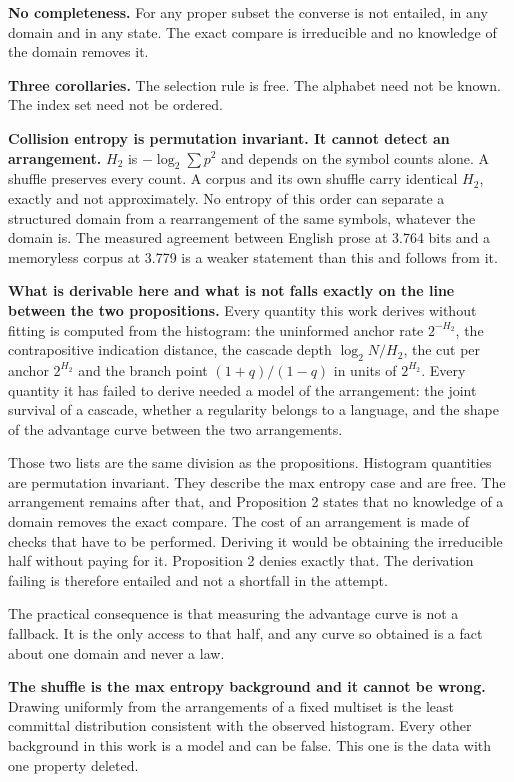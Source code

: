\textbf{No completeness.} For any proper subset the converse is not entailed, in any domain and in any state. The exact compare is irreducible and no knowledge of the domain removes it.

\textbf{Three corollaries.} The selection rule is free. The alphabet need not be known. The index set need not be ordered.

\textbf{Collision entropy is permutation invariant. It cannot detect an arrangement.} \(H_2\) is \(-\log_2 \sum p^2\) and depends on the symbol counts alone. A shuffle preserves every count. A corpus and its own shuffle carry identical \(H_2\), exactly and not approximately. No entropy of this order can separate a structured domain from a rearrangement of the same symbols, whatever the domain is. The measured agreement between English prose at 3.764 bits and a memoryless corpus at 3.779 is a weaker statement than this and follows from it.

\textbf{What is derivable here and what is not falls exactly on the line between the two propositions.} Every quantity this work derives without fitting is computed from the histogram: the uninformed anchor rate \(2^{-H_2}\), the contrapositive indication distance, the cascade depth \(\log_2 N / H_2\), the cut per anchor \(2^{H_2}\) and the branch point \((1+q)/(1-q)\) in units of \(2^{H_2}\). Every quantity it has failed to derive needed a model of the arrangement: the joint survival of a cascade, whether a regularity belongs to a language, and the shape of the advantage curve between the two arrangements.

Those two lists are the same division as the propositions. Histogram quantities are permutation invariant. They describe the max entropy case and are free. The arrangement remains after that, and Proposition 2 states that no knowledge of a domain removes the exact compare. The cost of an arrangement is made of checks that have to be performed. Deriving it would be obtaining the irreducible half without paying for it. Proposition 2 denies exactly that. The derivation failing is therefore entailed and not a shortfall in the attempt.

The practical consequence is that measuring the advantage curve is not a fallback. It is the only access to that half, and any curve so obtained is a fact about one domain and never a law.

\textbf{The shuffle is the max entropy background and it cannot be wrong.} Drawing uniformly from the arrangements of a fixed multiset is the least committal distribution consistent with the observed histogram. Every other background in this work is a model and can be false. This one is the data with one property deleted.

